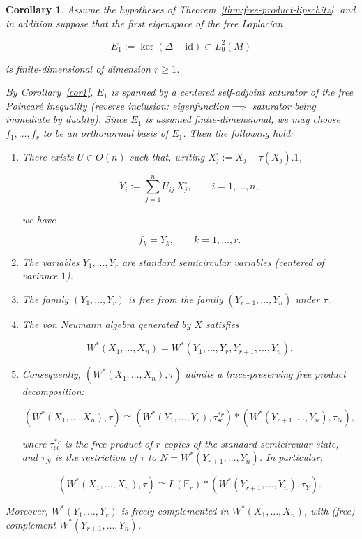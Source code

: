 \documentclass[10pt,a4paper,reqno]{amsart}
\newtheorem{corollary}[theorem]{Corollary}
\begin{document}
\begin{corollary}\label{cor:multi-free-obata}
Assume the hypotheses of Theorem~\ref{thm:free-product-lipschitz}, and in addition suppose that
the first eigenspace of the free Laplacian


\[
    E_1 := \ker(\Delta - \mathrm{id}) \subset L^2_0(M)
\]


is finite-dimensional of dimension $r \ge 1$.

By Corollary~\ref{cor1}, $E_1$ is spanned by a centered self-adjoint saturator of the free Poincaré inequality (reverse inclusion: \textit{eigenfunction}$\implies$ \textit{saturator} being immediate by duality). Since $E_1$ is assumed finite-dimensional, we may choose $f_1,\ldots,f_r$ to be an orthonormal basis of $E_1$. Then the following hold:

\begin{enumerate}

  \item There exists $U \in O(n)$ such that, writing $X_j^\circ := X_j - \tau(X_j).1$,
  

\[
      Y_i := \sum_{j=1}^n U_{ij}\,X_j^\circ,\qquad i=1,\ldots,n,
  \]


  we have
  

\[
      f_k = Y_k,\qquad k=1,\ldots,r.
  \]



  \item The variables $Y_1,\ldots,Y_r$ are standard semicircular variables (centered of variance $1$).

  \item The family $(Y_1,\ldots,Y_r)$ is free from the family $(Y_{r+1},\ldots,Y_n)$ under $\tau$.

  \item The von Neumann algebra generated by $X$ satisfies
  

\[
      W^\ast(X_1,\ldots,X_n)
      =
      W^\ast(Y_1,\ldots,Y_r,Y_{r+1},\ldots,Y_n).
  \]



  \item Consequently, $(W^\ast(X_1,\ldots,X_n),\tau)$ admits a trace-preserving
  free product decomposition:
  

\[
      (W^\ast(X_1,\ldots,X_n),\tau)
      \cong
      (W^\ast(Y_1,\ldots,Y_r),\tau_{\mathrm{sc}}^{*r})
      *
      (W^\ast(Y_{r+1},\ldots,Y_n),\tau_N),
  \]


  where $\tau_{\mathrm{sc}}^{*r}$ is the free product of $r$ copies of the standard
  semicircular state, and $\tau_N$ is the restriction of $\tau$ to
  $N=W^\ast(Y_{r+1},\ldots,Y_n)$. In particular,
  

\[
      (W^\ast(X_1,\ldots,X_n),\tau)
      \cong
      L(\mathbb{F}_r)
      *
      (W^\ast(Y_{r+1},\ldots,Y_n),\tau_Y).
  \]



\end{enumerate}

Moreover, $W^\ast(Y_1,\ldots,Y_r)$ is freely complemented in
$W^\ast(X_1,\ldots,X_n)$, with (free) complement $W^\ast(Y_{r+1},\ldots,Y_n)$.
\end{corollary}
\end{document}
